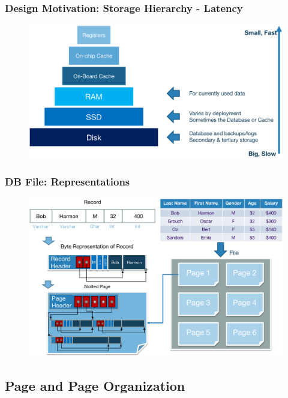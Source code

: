 \begin{frame}[fragile]
	\frametitle{Design Motivation: Storage Hierarchy - Latency}
	\begin{figure}
		\includegraphics[width=0.85\linewidth]{figs/dbfile-latency2.pdf}
	\end{figure}
\end{frame}





\begin{frame}[fragile]
	\frametitle{DB File: Representations}
	\begin{figure}
		\includegraphics[width=0.75\linewidth]{figs/dbfile-representation.pdf}
	\end{figure}
\end{frame}


\subsection{Page and Page Organization}
